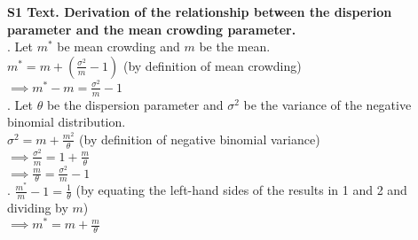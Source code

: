 \documentclass{article}
\begin{document}
{\noindent \bf S1 Text. Derivation of the relationship between the disperion parameter and the mean crowding parameter.}\\

. Let $m^*$ be mean crowding and $m$ be the mean.\\
$m^* = m +(\frac{\sigma^2}{m} -1)$ (by definition of mean crowding)\\
$ \implies m^*- m = \frac{\sigma^2}{m} -1$\\

. Let $\theta$ be the dispersion parameter and $\sigma^2$ be the variance of the negative binomial distribution.\\ 
$\sigma^2 = m + \frac{m^2}{\theta}$ (by definition of negative binomial variance)\\ $\implies \frac{\sigma^2}{m} = 1 + \frac{m}{\theta}$\\
$\implies \frac{m}{\theta} = \frac{\sigma^2}{m} - 1$\\

. $\frac{m^*}{m} - 1 = \frac{1}{\theta}$ (by equating the left-hand sides of the results in 1 and 2 and dividing by $m$) \\
$\implies m^*= m + \frac{m}{\theta}$
\end{document}

